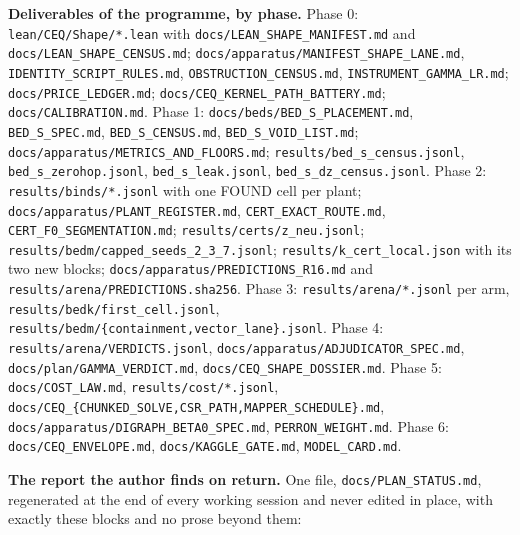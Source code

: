 \documentclass[11pt,a4paper]{article}
\theoremstyle{plain}
\theoremstyle{definition}
\theoremstyle{remark}
\begin{document}
\textbf{Deliverables of the programme, by phase.} Phase 0:
\texttt{lean/CEQ/Shape/*.lean} with
\texttt{docs/LEAN\_SHAPE\_MANIFEST.md} and
\texttt{docs/LEAN\_SHAPE\_CENSUS.md};
\texttt{docs/apparatus/MANIFEST\_SHAPE\_LANE.md},
\texttt{IDENTITY\_SCRIPT\_RULES.md}, \texttt{OBSTRUCTION\_CENSUS.md},
\texttt{INSTRUMENT\_GAMMA\_LR.md}; \texttt{docs/PRICE\_LEDGER.md};
\texttt{docs/CEQ\_KERNEL\_PATH\_BATTERY.md};
\texttt{docs/CALIBRATION.md}. Phase 1:
\texttt{docs/beds/BED\_S\_PLACEMENT.md}, \texttt{BED\_S\_SPEC.md},
\texttt{BED\_S\_CENSUS.md}, \texttt{BED\_S\_VOID\_LIST.md};
\texttt{docs/apparatus/METRICS\_AND\_FLOORS.md};
\texttt{results/bed\_s\_census.jsonl}, \texttt{bed\_s\_zerohop.jsonl},
\texttt{bed\_s\_leak.jsonl}, \texttt{bed\_s\_dz\_census.jsonl}. Phase 2:
\texttt{results/binds/*.jsonl} with one FOUND cell per plant;
\texttt{docs/apparatus/PLANT\_REGISTER.md},
\texttt{CERT\_EXACT\_ROUTE.md}, \texttt{CERT\_F0\_SEGMENTATION.md};
\texttt{results/certs/z\_neu.jsonl};
\texttt{results/bedm/capped\_seeds\_2\_3\_7.jsonl};
\texttt{results/k\_cert\_local.json} with its two new blocks;
\texttt{docs/apparatus/PREDICTIONS\_R16.md} and
\texttt{results/arena/PREDICTIONS.sha256}. Phase 3:
\texttt{results/arena/*.jsonl} per arm,
\texttt{results/bedk/first\_cell.jsonl},
\texttt{results/bedm/\{containment,vector\_lane\}.jsonl}. Phase 4:
\texttt{results/arena/VERDICTS.jsonl},
\texttt{docs/apparatus/ADJUDICATOR\_SPEC.md},
\texttt{docs/plan/GAMMA\_VERDICT.md},
\texttt{docs/CEQ\_SHAPE\_DOSSIER.md}. Phase 5:
\texttt{docs/COST\_LAW.md}, \texttt{results/cost/*.jsonl},
\texttt{docs/CEQ\_\{CHUNKED\_SOLVE,CSR\_PATH,MAPPER\_SCHEDULE\}.md},
\texttt{docs/apparatus/DIGRAPH\_BETA0\_SPEC.md},
\texttt{PERRON\_WEIGHT.md}. Phase 6: \texttt{docs/CEQ\_ENVELOPE.md},
\texttt{docs/KAGGLE\_GATE.md}, \texttt{MODEL\_CARD.md}.

\textbf{The report the author finds on return.} One file,
\texttt{docs/PLAN\_STATUS.md}, regenerated at the end of every working
session and never edited in place, with exactly these blocks and no
prose beyond them:
\end{document}
